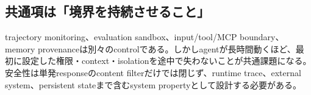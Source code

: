 \subsection{共通項は「境界を持続させること」}

trajectory monitoring、evaluation sandbox、input/tool/MCP boundary、memory provenanceは別々のcontrolである。しかしagentが長時間動くほど、最初に設定した権限・context・isolationを途中で失わないことが共通課題になる。安全性は単発responseのcontent filterだけでは閉じず、runtime trace、external system、persistent stateまで含むsystem propertyとして設計する必要がある。\autocite{src-732b15b19744,src-a5ab872c216c,src-e08216aa168c}
